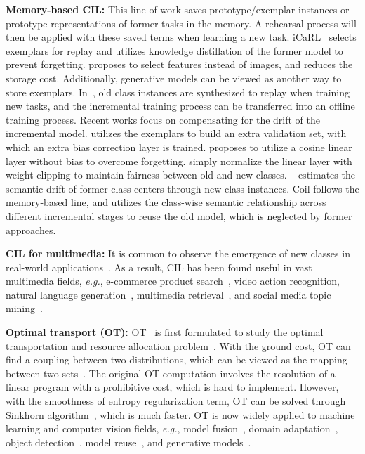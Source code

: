 \documentclass[sigconf]{acmart}
\newcommand{\eg}{\emph{e.g.}}
\newcommand{\name}{{\sc Coil }}
\begin{document}
{\bf Memory-based CIL:} This line of work saves prototype/exemplar instances or prototype representations of former tasks in the memory. A rehearsal process will then be applied with these saved terms when learning a new task. iCaRL~\cite{rebuffi2017icarl} selects exemplars for replay and utilizes knowledge distillation of the former model to prevent forgetting. \cite{IscenZLS20} proposes to select features instead of images, and reduces the storage cost. 
Additionally, generative models can be viewed as another way to store exemplars. In~\cite{xiang2019incremental}, old class instances are synthesized to replay when training new tasks, and the incremental training process can be transferred into an offline training process. 
Recent works focus on compensating for the drift of the incremental model. \cite{wu2019large} utilizes the exemplars to build an extra validation set, with which an extra bias correction layer is trained. \cite{hou2019learning} proposes to utilize a cosine linear layer without bias to overcome forgetting. 
\cite{zhao2020maintaining,belouadah2019il2m} simply normalize the linear layer with weight clipping to maintain fairness between old and new classes. ~\cite{yu2020semantic} estimates the semantic drift of former class centers through new class instances. 
\name follows the memory-based line, and utilizes the class-wise semantic relationship across different incremental stages to reuse the old model, which is neglected by former approaches.

{\bf CIL for multimedia:} It is common to observe the emergence of new classes in real-world applications~\cite{zhou2016learnware,zhou2021learning,zhou2021detecting,ye2021contextualizing,wei2019multiple,ye2021learning,ning2021badge,yang21,lu2021tailoring,yang2015auxiliary}. As a result,
CIL has been found useful in vast multimedia fields, \eg, e-commerce product search~\cite{wang2020metasearch}, video action recognition\cite{yang2019}, natural language generation~\cite{mi2020continual}, multimedia retrieval~\cite{tian2020complementary}, and social media topic mining~\cite{xu2019open}.


{\bf Optimal transport (OT):} OT~\cite{villani2008optimal,peyre2019} is first formulated to study the optimal transportation and resource allocation problem~\cite{kantorovich1960mathematical,monge1781memoire}. With the ground cost, OT can find a coupling between two distributions, which can be viewed as the mapping between two sets~\cite{kolouri2017optimal,villani2008optimal}. 
The original OT computation involves the resolution of a linear program with a prohibitive cost, which is hard to implement. However, with the smoothness of entropy regularization term,
OT can be solved through Sinkhorn algorithm~\cite{cuturi2013sinkhorn,sinkhorn1967concerning}, which is much faster.
OT is now widely applied to machine learning and computer vision fields, \eg, model fusion~\cite{singh2020model}, 
domain adaptation~\cite{courty2016optimal}, object detection~\cite{ge2021ota}, model reuse~\cite{ye2020heterogeneous,ye2018rectify}, and generative models~\cite{arjovsky2017wasserstein,balaji2020robust}. 
\end{document}
